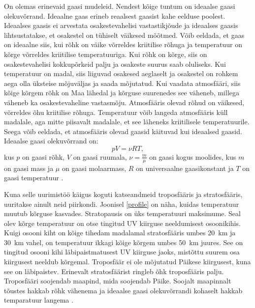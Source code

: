 \documentclass{trkut}%
\begin{document}
On olemas erinevaid gaasi mudeleid. Nendest kõige tuntum on ideaalse gaasi olekuvõrrand. Ideaalne gaas erineb reaalsest gaasist kahe eelduse poolest. Ideaalses gaasis ei arvestata osakestevahelisi vastastikjõude ja ideaalses gaasis lihtsustatakse, et osakestel on tühiselt väikesed mõõtmed. Võib eeldada, et gaas on ideaalne siis, kui rõhk on väike võrreldes kriitilise rõhuga ja temperatuur on kõrge võrreldes kriitilise temperatuuriga. Kui rõhk on kõrge, siis on osakestevahelisi kokkupõrkeid palju ja osakeste suurus saab oluliseks. Kui temperatuur on madal, siis liiguvad osakesed aeglaselt ja osakestel on rohkem aega olla üksteise mõjuväljas ja saada mõjutatud. Kui vaadata atmosfääri, siis kõige kõrgem rõhk on Maa lähedal ja kõrguse suurenedes see väheneb, millega väheneb ka osakestevaheline vastasmõju. Atmosfääris olevad rõhud on väikesed, võrreldes õhu kriitilise rõhuga. Temperatuur võib langeda atmosfääris küll madalale, aga mitte piisavalt madalale, et see läheneks kriitilisele temperatuurile. Seega võib eeldada, et atmosfääris olevad gaasid käituvad kui ideaalsed gaasid. Ideaalse gaasi olekuvõrrand on:
\begin{equation}\label{eq8}
pV=\nu RT ,
\end{equation}
kus $p$ on gaasi rõhk, $V$ on gaasi ruumala, $\nu = \frac{m}{\mu}$ on gaasi kogus moolides, kus $m$ on gaasi mass ja $\mu$ on gaasi molaarmass, $R$ on universaalne gaasikonstant ja $T$ on gaasi temperatuur \parencite{IGasKhan}.


Kuna selle uurimistöö käigus koguti katseandmeid troposfääris ja stratosfääris, uuritakse ainult neid piirkondi. Joonisel \ref{profile} on näha, kuidas temperatuur muutub kõrguse kasvades. Stratopausis on üks temperatuuri maksimume. Seal olev kõrge temperatuur on otse tingitud UV kiirguse neeldumisest osoonikihis. Kuigi osooni kiht on kõige tihedam madalamal stratosfääris umbes \SI{20}{km} ja \SI{30}{km} vahel, on temperatuur ikkagi kõige kõrgem umbes \SI{50}{km} juures. See on tingitud osooni kihi läbipaistmatusest UV kiirguse jaoks, mistõttu suurem osa kiirgusest neeldub kõrgemal. Troposfäär ei ole mõjutatud Päikese kiirgusest, kuna see on läbipaistev. Erinevalt stratosfäärist ringleb õhk troposfääris palju. Troposfääri soojendab maapind, mida soojendab Päike. Soojalt maapinnalt tõustes hakkab rõhk vähenema ja ideaalse gaasi olekuvõrrandi kohaselt hakkab temparatuur langema \parencite[24--26]{book:779878}.
\end{document}
